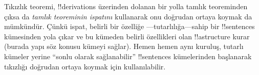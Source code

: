 Tıkızlık teoremi, !!{derivation}s üzerinden dolanan bir yolla tamlık
teoreminden çıksa da \emph{tamlık teoreminin ispatını} kullanarak onu
doğrudan ortaya koymak da mümkündür. Çünkü ispat, belirli bir özelliğe
---tutarlılığa---sahip bir !!{sentence}s kümesinden yola çıkar ve bu
kümeden belirli özellikleri olan !!a{structure} kurar (burada yapı söz
konusu kümeyi sağlar). Hemen hemen aynı kuruluş, tutarlı kümeler yerine
``sonlu olarak sağlanabilir'' !!{sentence}s kümelerinden başlanarak
tıkızlığı doğrudan ortaya koymak için kullanılabilir.

